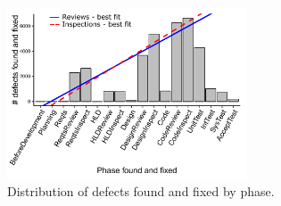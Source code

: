 \documentclass{sig-alternate}
\begin{document}
 
 

\begin{figure}[!t] 

\begin{center}
\includegraphics[height=2in]{img/fix-phase-dist.pdf}
\end{center}

\caption{Distribution of defects found and fixed by phase.}
\label{fig:fix-phase-dist}
\end{figure}
\end{document}
